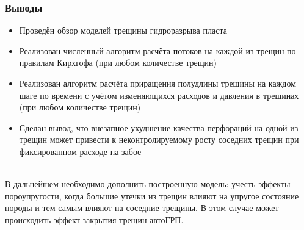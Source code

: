 \documentclass{beamer}
\begin{document}
\begin{frame}
\frametitle{Выводы}

\small

\begin{itemize}
	\item Проведён обзор моделей трещины гидроразрыва пласта
	\item Реализован численный алгоритм расчёта потоков на каждой из трещин по правилам Кирхгофа (при любом количестве трещин)
	\item Реализован алгоритм расчёта приращения полудлины трещины на каждом шаге по времени с учётом изменяющихся расходов и давления в трещинах (при любом количестве трещин)
	\item Сделан вывод, что внезапное ухудшение качества перфораций на одной из трещин может привести к неконтролируемому росту соседних трещин при фиксированном расходе на забое
\end{itemize}
\ \\

В дальнейшем необходимо дополнить построенную модель: учесть эффекты пороупругости, когда большие утечки из трещин влияют на упругое состояние породы и тем самым влияют на соседние трещины.
В этом случае может происходить эффект закрытия трещин автоГРП.

\normalsize

\end{frame}
\end{document}
